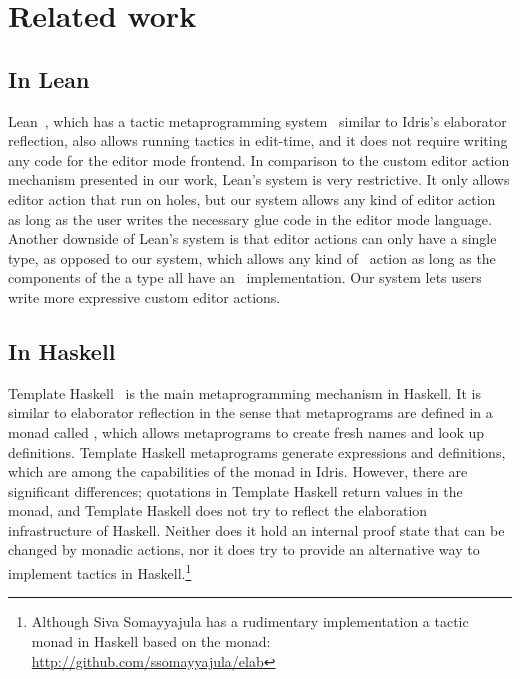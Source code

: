 \section{Related work} \label{sec:relatedwork}


\subsection{In Lean}

Lean~\cite{lean}, which has a tactic metaprogramming system~\cite{leanmeta}
similar to Idris's elaborator reflection, also allows running tactics in
edit-time, and it does not require writing any code for the editor mode
frontend.
In comparison to the custom editor action mechanism presented in our work, Lean's
system is very restrictive. It only allows editor action that run on holes, but
our system allows any kind of editor action as long as the user writes the
necessary glue code in the editor mode language. Another downside of Lean's
system is that editor actions can only have a single type, as opposed to our
system, which allows any kind of \Elab\ action as long as the components of the
a type all have an \Editorable\ implementation. Our system lets users write
more expressive custom editor actions.

\subsection{In Haskell}

Template Haskell~\cite{th} is the main metaprogramming mechanism in Haskell.
It is similar to elaborator reflection in the sense that metaprograms are
defined in a monad called , which allows metaprograms to create fresh
names and look up definitions.
Template Haskell metaprograms generate expressions and definitions, which are
among the capabilities of the \Elab{} monad in Idris.
However, there are significant differences;
quotations in Template Haskell return values in the  monad, and Template
Haskell does not try to reflect the elaboration infrastructure of
Haskell.
Neither does it hold an internal proof state that can be changed by monadic
actions, nor it does try to provide an alternative way to implement tactics in
Haskell.\footnote{Although Siva Somayyajula has a rudimentary
implementation a tactic monad in Haskell based on the  monad:
\url{http://github.com/ssomayyajula/elab}}

